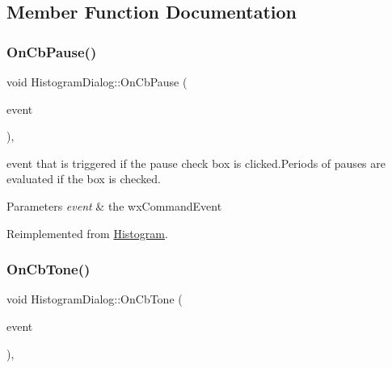 \subsection{Member Function Documentation}
\mbox{\label{classHistogramDialog_a52b28f05b31b490b10d6ed833ddff795}} 
\subsubsection{\texorpdfstring{On\+Cb\+Pause()}{OnCbPause()}}
{\footnotesize\ttfamily void Histogram\+Dialog\+::\+On\+Cb\+Pause (\begin{DoxyParamCaption}\item[{wx\+Command\+Event \&}]{event }\end{DoxyParamCaption})\hspace{0.3cm}{\ttfamily [private]}, {\ttfamily [virtual]}}



event that is triggered if the pause check box is clicked.\+Periods of pauses are evaluated if the box is checked. 


\begin{DoxyParams}{Parameters}
{\em event} & the wx\+Command\+Event \\
\hline
\end{DoxyParams}


Reimplemented from \hyperlink{classHistogram}{Histogram}.

\mbox{\label{classHistogramDialog_a3212f57cc24b1f904ff3109820cae5c1}} 
\subsubsection{\texorpdfstring{On\+Cb\+Tone()}{OnCbTone()}}
{\footnotesize\ttfamily void Histogram\+Dialog\+::\+On\+Cb\+Tone (\begin{DoxyParamCaption}\item[{wx\+Command\+Event \&}]{event }\end{DoxyParamCaption})\hspace{0.3cm}{\ttfamily [private]}, {\ttfamily [virtual]}}



